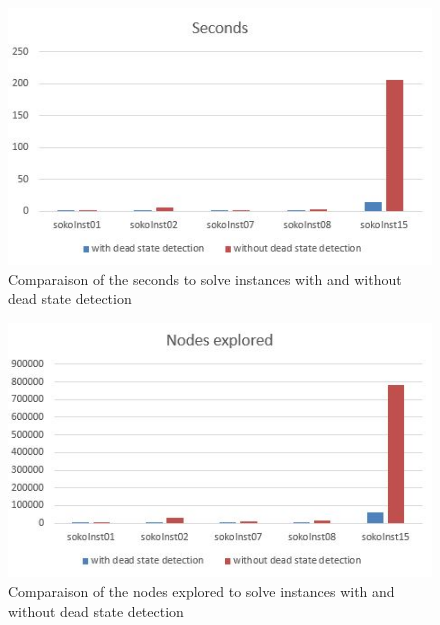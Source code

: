 \documentclass{article}
\begin{document}
\begin{figure}[h] %
 \centering
 \includegraphics[scale=0.9]{seconds.JPG} 
 \caption{Comparaison of the seconds to solve instances with and without dead state detection}
 \label{dia:sec}
\end{figure}

\begin{figure}[h] %
 \centering
 \includegraphics[scale=0.9]{nodes.JPG} 
 \caption{Comparaison of the nodes explored to solve instances with and without dead state detection}
 \label{dia:nodes}
\end{figure}
\end{document}
